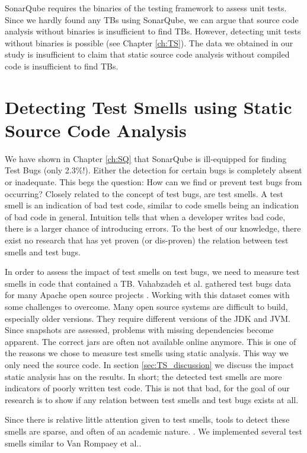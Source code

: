 \documentclass{uvamscse}
\newcommand{\Atestbugs}{Vahabzadeh et al.}
\newcommand{\AsigTS}{Van Rompaey et al.}
\begin{document}
SonarQube requires the binaries of the testing framework to assess unit tests. Since we hardly found any TBs using SonarQube, we can argue that source code analysis without binaries is insufficient to find TBs. However, detecting unit tests without binaries is possible (see Chapter \ref{ch:TS}). The data we obtained in our study is insufficient to claim that static source code analysis without compiled code is insufficient to find TBs.




\chapter{Detecting Test Smells using Static Source Code Analysis}
We have shown in Chapter \ref{ch:SQ} that SonarQube is ill-equipped for finding Test Bugs (only 2.3\%!). Either the detection for certain bugs is completely absent or inadequate. This begs the question: How can we find or prevent test bugs from occurring? Closely related to the concept of test bugs, are test smells. A test smell is an indication of bad test code, similar to code smells being an indication of bad code in general. Intuition tells that when a developer writes bad code, there is a larger chance of introducing errors. To the best of our knowledge, there exist no research that has yet proven (or dis-proven) the relation between test smells and test bugs. 

In order to assess the impact of test smells on test bugs, we need to measure test smells in code that contained a TB. \Atestbugs{} gathered test bugs data for many Apache open source projects \cite{vahabzadeh2015empirical}. Working with this dataset comes with some challenges to overcome. Many open source systems are difficult to build, especially older versions. They require different versions of the JDK and JVM. Since snapshots are assessed, problems with missing dependencies become apparent. The correct jars are often not available online anymore. This is one of the reasons we chose to measure test smells using static analysis. This way we only need the source code. In section \ref{sec:TS_discussion} we discuss the impact static analysis has on the results. In short; the detected test smells are more indicators of poorly written test code. This is not that bad, for the goal of our research is to show if any relation between test smells and test bugs exists at all. 

Since there is relative little attention given to test smells, tools to detect these smells are sparse, and often of an academic nature. \cite{van2006characterizing, bavota2012empirical, greiler2013automated}. We implemented several test smells similar to \AsigTS \cite{van2006characterizing}. 
\end{document}
